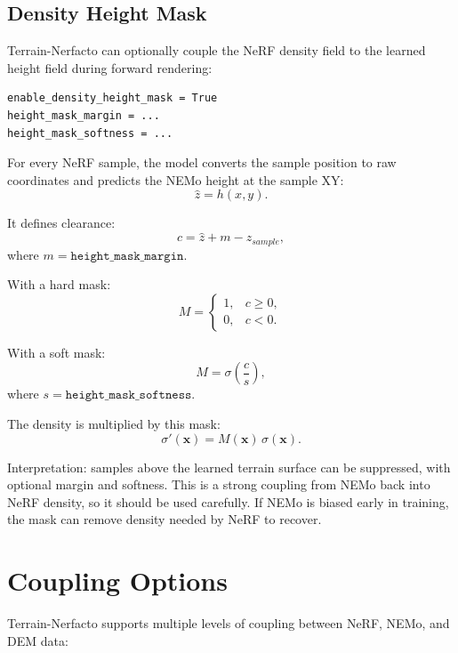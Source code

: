 \documentclass[11pt]{article}
\begin{document}
\subsection{Density Height Mask}

Terrain-Nerfacto can optionally couple the NeRF density field to the learned height field during forward rendering:

\begin{lstlisting}
enable_density_height_mask = True
height_mask_margin = ...
height_mask_softness = ...
\end{lstlisting}

For every NeRF sample, the model converts the sample position to raw coordinates and predicts the NEMo height at the sample XY:
\[
  \hat{z} = h(x,y).
\]

It defines clearance:
\[
  c = \hat{z} + m - z_{sample},
\]
where \(m=\texttt{height\_mask\_margin}\).

With a hard mask:
\[
  M =
  \begin{cases}
    1, & c \ge 0,\\
    0, & c < 0.
  \end{cases}
\]

With a soft mask:
\[
  M = \sigma\left(\frac{c}{s}\right),
\]
where \(s=\texttt{height\_mask\_softness}\).

The density is multiplied by this mask:
\[
  \sigma'(\mathbf{x}) = M(\mathbf{x})\,\sigma(\mathbf{x}).
\]

Interpretation: samples above the learned terrain surface can be suppressed, with optional margin and softness. This is a strong coupling from NEMo back into NeRF density, so it should be used carefully. If NEMo is biased early in training, the mask can remove density needed by NeRF to recover.

\section{Coupling Options}

Terrain-Nerfacto supports multiple levels of coupling between NeRF, NEMo, and DEM data:
\end{document}
